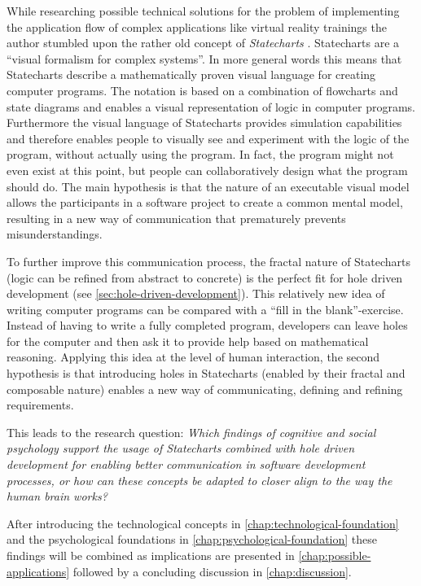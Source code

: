 While researching possible technical solutions for the problem of implementing the application flow of complex applications like virtual reality trainings the author stumbled upon the rather old concept of \emph{Statecharts} \autocite{harel_statecharts:_1987}. Statecharts are a ``visual formalism for complex systems''. In more general words this means that Statecharts describe a mathematically proven visual language for creating computer programs. The notation is based on a combination of flowcharts and state diagrams and enables a visual representation of logic in computer programs. Furthermore the visual language of Statecharts provides simulation capabilities and therefore enables people to visually see and experiment with the logic of the program, without actually using the program. In fact, the program might not even exist at this point, but people can collaboratively design what the program should do. The main hypothesis is that the nature of an executable visual model allows the participants in a software project to create a common mental model, resulting in a new way of communication that prematurely prevents misunderstandings.

To further improve this communication process, the fractal nature of Statecharts (logic can be refined from abstract to concrete) is the perfect fit for hole driven development (see \cref{sec:hole-driven-development}). This relatively new idea of writing computer programs can be compared with a ``fill in the blank''-exercise. Instead of having to write a fully completed program, developers can leave holes for the computer and then ask it to provide help based on mathematical reasoning. Applying this idea at the level of human interaction, the second hypothesis is that introducing holes in Statecharts (enabled by their fractal and composable nature) enables a new way of communicating, defining and refining requirements.

This leads to the research question: \emph{Which findings of cognitive and social psychology support the usage of Statecharts combined with hole driven development for enabling better communication in software development processes, or how can these concepts be adapted to closer align to the way the human brain works?}

After introducing the technological concepts in \cref{chap:technological-foundation} and the psychological foundations in \cref{chap:psychological-foundation} these findings will be combined as implications are presented in \cref{chap:possible-applications} followed by a concluding discussion in \cref{chap:discussion}.

